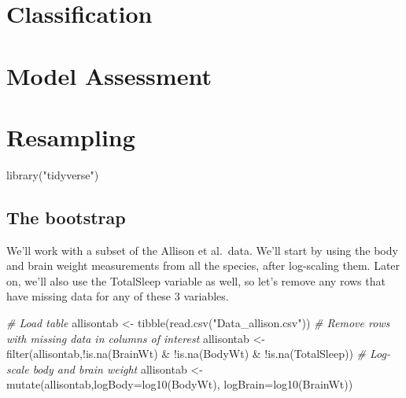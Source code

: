 \documentclass[
]{book}
\newenvironment{Shaded}{\begin{snugshade}}{\end{snugshade}}
\newcommand{\AttributeTok}[1]{\textcolor[rgb]{0.77,0.63,0.00}{#1}}
\newcommand{\CommentTok}[1]{\textcolor[rgb]{0.56,0.35,0.01}{\textit{#1}}}
\newcommand{\FunctionTok}[1]{\textcolor[rgb]{0.00,0.00,0.00}{#1}}
\newcommand{\NormalTok}[1]{#1}
\newcommand{\OtherTok}[1]{\textcolor[rgb]{0.56,0.35,0.01}{#1}}
\newcommand{\SpecialCharTok}[1]{\textcolor[rgb]{0.00,0.00,0.00}{#1}}
\newcommand{\StringTok}[1]{\textcolor[rgb]{0.31,0.60,0.02}{#1}}
\begin{document}
\hypertarget{classification}{%
\chapter{Classification}\label{classification}}

\hypertarget{model-assessment}{%
\chapter{Model Assessment}\label{model-assessment}}

\hypertarget{resampling}{%
\chapter{Resampling}\label{resampling}}

\begin{Shaded}
\begin{Highlighting}[]
\FunctionTok{library}\NormalTok{(}\StringTok{"tidyverse"}\NormalTok{)}
\end{Highlighting}
\end{Shaded}

\hypertarget{the-bootstrap}{%
\section{The bootstrap}\label{the-bootstrap}}

We'll work with a subset of the Allison et al.~data. We'll start by using the body and brain weight measurements from all the species, after log-scaling them. Later on, we'll also use the TotalSleep variable as well, so let's remove any rows that have missing data for any of these 3 variables.

\begin{Shaded}
\begin{Highlighting}[]
\CommentTok{\# Load table}
\NormalTok{allisontab }\OtherTok{\textless{}{-}} \FunctionTok{tibble}\NormalTok{(}\FunctionTok{read.csv}\NormalTok{(}\StringTok{"Data\_allison.csv"}\NormalTok{))}
\CommentTok{\# Remove rows with missing data in columns of interest }
\NormalTok{allisontab }\OtherTok{\textless{}{-}} \FunctionTok{filter}\NormalTok{(allisontab,}\SpecialCharTok{!}\FunctionTok{is.na}\NormalTok{(BrainWt) }\SpecialCharTok{\&} \SpecialCharTok{!}\FunctionTok{is.na}\NormalTok{(BodyWt) }\SpecialCharTok{\&} \SpecialCharTok{!}\FunctionTok{is.na}\NormalTok{(TotalSleep))}
\CommentTok{\# Log{-}scale body and brain weight}
\NormalTok{allisontab }\OtherTok{\textless{}{-}} \FunctionTok{mutate}\NormalTok{(allisontab,}\AttributeTok{logBody=}\FunctionTok{log10}\NormalTok{(BodyWt), }\AttributeTok{logBrain=}\FunctionTok{log10}\NormalTok{(BrainWt))}
\end{Highlighting}
\end{Shaded}
\end{document}
